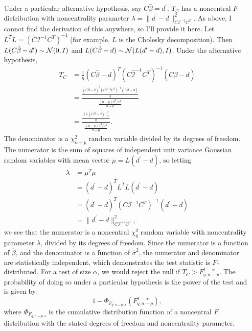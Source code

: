 \documentclass[12pt]{article}
\begin{document}
Under a particular alternative hypothesis, say $C \hat{\beta} = d^\prime$, $T_C$ has a noncentral $F$ distribution with noncentrality parameter $\lambda = \| d^\prime - d \|_{C \mathcal{I}^{-1} C^T}^2$. As above, I cannot find the derivation of this anywhere, so I'll provide it here. Let $L^T L = (C \mathcal{I}^{-1} C^T)^{-1}$ (for example, $L$ is the Cholesky decomposition). Then $L (C \hat{\beta} - d^\prime) \sim {\mathcal N}(0, I)$ and $L(C \hat{\beta} - d) \sim {\mathcal N}(L (d^\prime - d), I)$. Under the alternative hypothesis,
\begin{align*}
   T_C &= \frac{1}{q} (C \hat{\beta} - d)^T (C \hat{\mathcal{I}}^{-1} C^T)^{-1} (C \hat{\beta} - d) \\
      &= \frac{\frac{(C \hat{\beta} - d)^T (C \mathcal{I}^{-1} C^T)^{-1} (C \hat{\beta} - d)}{q}}{\frac{(n-p) \hat{\sigma}^2 / \sigma^2}{n-p}} \\
      &= \frac{\frac{\| L (C \hat{\beta} - d) \|_2^2}{q}}{\frac{(n-p) \hat{\sigma}^2 / \sigma^2}{n-p}}.
\end{align*}
The denominator is a $\chi_{n-p}^2$ random variable divided by its degrees of freedom. The numerator is the sum of squares of independent unit variance Gaussian random variables with mean vector $\mu = L (d^\prime - d)$, so letting 
\begin{align*}
   \lambda &= \mu^T \mu \\
      &= (d^\prime - d)^T L^T L (d^\prime - d) \\
      &= (d^\prime - d)^T (C \mathcal{I}^{-1} C^T)^{-1} (d^\prime - d) \\
      &= \| d^\prime - d \|_{C \mathcal{I}^{-1} C^T}^2,
\end{align*}
we see that the numerator is a noncentral $\chi_q^2$ random variable with noncentrality parameter $\lambda$, divided by its degrees of freedom. Since the numerator is a function of $\hat{\beta}$, and the denominator is a function of $\hat{\sigma}^2$, the numerator and denominator are statistically independent, which demonstrates the test statistic is $F$-distributed. For a test of size $\alpha$, we would reject the null if $T_C > F_{q, n-p}^{1 - \alpha}$. The probability of doing so under a particular hypothesis is the power of the test and is given by:
\begin{displaymath}
   1 - \Phi_{F_{q, n-p; \lambda}}(F_{q, n-p}^{1 - \alpha}),
\end{displaymath}
where $\Phi_{F_{q, n-p; \lambda}}$ is the cumulative distribution function of a noncentral $F$ distribution with the stated degrees of freedom and noncentrality parameter.
\end{document}
